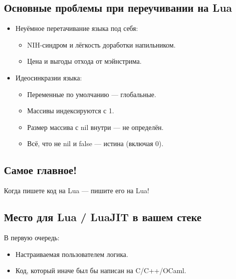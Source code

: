 \documentclass[aspectratio=169,handout,bigger]{beamer}
\begin{document}

\subsection*{Основные проблемы при переучивании на Lua}

\begin{frame}
  \begin{itemize}
    \item Неуёмное перетачивание языка под себя:
    \begin{itemize}
      \item NIH-синдром и лёгкость доработки напильником.
      \item Цена и выгоды отхода от мэйнстрима.
    \end{itemize}
    \item Идеосинкразии языка:
    \begin{itemize}
      \item Переменные по умолчанию — глобальные.
      \item Массивы индексируются с 1.
      \item Размер массива с nil внутри — не определён.
      \item Всё, что не nil и false — истина (включая 0).
    \end{itemize}
  \end{itemize}
\end{frame}


\subsection*{Самое главное!}

\begin{frame}
  \centering Когда пишете код на Lua — пишите его на Lua!
\end{frame}


\subsection*{Место для Lua / LuaJIT в вашем стеке}

\begin{frame}
  В первую очередь:

  \begin{itemize}
    \item Настраиваемая пользователем логика.
    \item Код, который иначе был бы написан на C/C++/OCaml.
  \end{itemize}
\end{frame}
\end{document}
